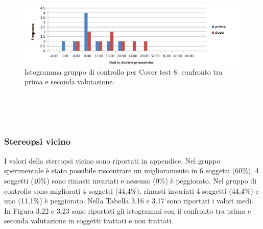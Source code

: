  \begin{figure}[h!]
	\centering
	\includegraphics[scale=0.38]{source/grafici/cover_test_8_giustissimo_non_trattati.png}
	\caption[Istogramma gruppo di controllo per Cover test 8]{Istogramma gruppo di controllo per Cover test 8: confronto tra prima e seconda valutazione.}
	\label{fig:issuexample}
\end{figure}
\\\ \\\
\subsubsection{Stereopsi vicino}

I valori della stereopsi vicino sono riportati in appendice. Nel gruppo sperimentale è stato possibile riscontrare un miglioramento in 6 soggetti (60\%), 4 soggetti (40\%) sono rimasti invariati e nessuno (0\%) è peggiorato. Nel gruppo di controllo sono migliorati 4 soggetti (44,4\%), rimasti invariati 4 soggetti (44,4\%) e uno (11,1\%) è peggiorato. Nella Tabella 3.16 e 3.17 sono riportati i valori medi. In Figura 3.22 e 3.23 sono riportati gli istogrammi con il confronto tra prima e seconda valutazione in soggetti trattati e non trattati.

